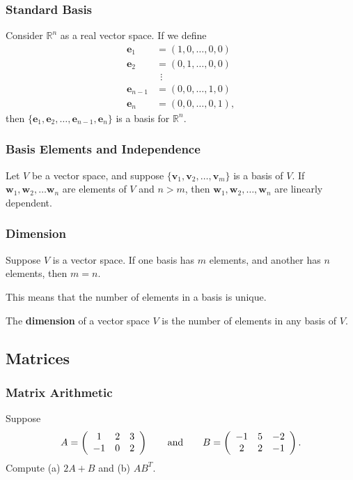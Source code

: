 \documentclass{beamer}
\begin{document}
\begin{frame}
\frametitle{Standard Basis}
Consider $\mathbb{R}^n$ as a real vector space. If we define
\begin{align*}
{\boldsymbol e_1} 		&= (1, 0, \ldots, 0, 0)\\
{\boldsymbol e_2} 		&= (0, 1, \ldots, 0, 0)\\
					&\ \ \vdots\\
{\boldsymbol e_{n - 1}} 	&= (0, 0, \ldots, 1, 0)\\
{\boldsymbol e_n} 		&= (0, 0, \ldots, 0, 1),
\end{align*}
then $\{{\boldsymbol e_1}, {\boldsymbol e_2}, \ldots, {\boldsymbol e_{n - 1}}, {\boldsymbol e_n}\}$ is a basis for $\mathbb{R}^n$.
\end{frame}

\begin{frame}
\frametitle{Basis Elements and Independence}
\begin{Theorem}
Let $V$ be a vector space, and suppose $\{ {\boldsymbol v_1}, {\boldsymbol v_2},\ldots, {\boldsymbol v_m}\}$ is a basis of $V$. If ${\boldsymbol w_1}, {\boldsymbol w_2}, \ldots {\boldsymbol w_n}$ are elements of $V$ and $n > m$, then ${\boldsymbol w_1}, {\boldsymbol w_2},\ldots, {\boldsymbol w_n}$ are linearly dependent.
\end{Theorem}
\end{frame}

\begin{frame}
\frametitle{Dimension}
\begin{Theorem}
Suppose $V$ is a vector space. If one basis has $m$ elements, and another has $n$ elements, then $m = n$.
\end{Theorem}

This means that the number of elements in a basis is unique. 

\begin{Definition}
The {\bf dimension} of a vector space $V$ is the number of elements in any basis of $V$.
\end{Definition}

\end{frame}

\subsection{Matrices} 

\begin{frame}[t]
\frametitle{Matrix Arithmetic}
\begin{Example}
Suppose 
$$
A = \left(\begin{array}{c c c} 1	&	2	&	3\\	-1	&	0	&	2\end{array}\right)\qquad\text{and}\qquad B = \left(\begin{array}{c c c} -1	&	5	&	-2\\	2	&	2	&	-1\end{array}\right).
$$
Compute (a) $2 A + B$ and (b) $A B^T$.
\end{Example}

\end{frame}
\end{document}
